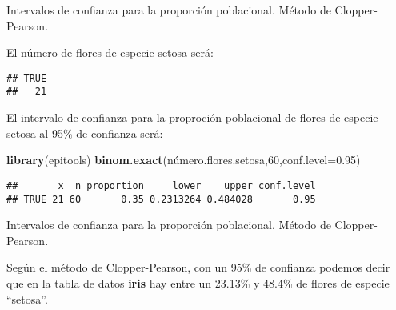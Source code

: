 \documentclass[ignorenonframetext,]{beamer}
\newenvironment{Shaded}{\begin{snugshade}}{\end{snugshade}}
\newcommand{\DataTypeTok}[1]{\textcolor[rgb]{0.13,0.29,0.53}{#1}}
\newcommand{\DecValTok}[1]{\textcolor[rgb]{0.00,0.00,0.81}{#1}}
\newcommand{\FloatTok}[1]{\textcolor[rgb]{0.00,0.00,0.81}{#1}}
\newcommand{\KeywordTok}[1]{\textcolor[rgb]{0.13,0.29,0.53}{\textbf{#1}}}
\newcommand{\NormalTok}[1]{#1}
\newcommand{\OperatorTok}[1]{\textcolor[rgb]{0.81,0.36,0.00}{\textbf{#1}}}
\newcommand{\StringTok}[1]{\textcolor[rgb]{0.31,0.60,0.02}{#1}}
\begin{document}
\begin{frame}[fragile]{Intervalos de confianza para la proporción
poblacional. Método de Clopper-Pearson.}
\protect\hypertarget{intervalos-de-confianza-para-la-proporcion-poblacional.-metodo-de-clopper-pearson.-4}{}

El número de flores de especie setosa será:

\begin{Shaded}
\end{Shaded}

\begin{verbatim}
## TRUE 
##   21
\end{verbatim}

El intervalo de confianza para la proproción poblacional de flores de
especie setosa al 95\% de confianza será:

\begin{Shaded}
\begin{Highlighting}[]
\KeywordTok{library}\NormalTok{(epitools)}
\KeywordTok{binom.exact}\NormalTok{(número.flores.setosa,}\DecValTok{60}\NormalTok{,}\DataTypeTok{conf.level=}\FloatTok{0.95}\NormalTok{)}
\end{Highlighting}
\end{Shaded}

\begin{verbatim}
##       x  n proportion     lower    upper conf.level
## TRUE 21 60       0.35 0.2313264 0.484028       0.95
\end{verbatim}

\end{frame}

\begin{frame}{Intervalos de confianza para la proporción poblacional.
Método de Clopper-Pearson.}
\protect\hypertarget{intervalos-de-confianza-para-la-proporcion-poblacional.-metodo-de-clopper-pearson.-5}{}

Según el método de Clopper-Pearson, con un 95\% de confianza podemos
decir que en la tabla de datos \textbf{iris} hay entre un 23.13\% y
48.4\% de flores de especie ``setosa''.

\end{frame}
\end{document}
